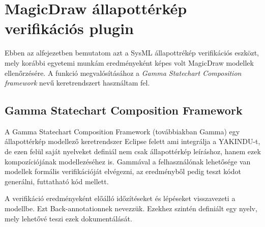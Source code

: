 \section{MagicDraw állapottérkép verifikációs plugin}

Ebben az alfejezetben bemutatom azt a SysML állapottrékép verifikációs eszközt, mely korábbi egyetemi munkám eredményeként képes volt MagicDraw modellek ellenőrzésére. A funkció megvalósításához a \emph{Gamma Statechart Composition framework} nevű keretrendszert használtam fel.

\subsection{Gamma Statechart Composition Framework}

A Gamma Statechart Composition Framework (továbbiakban Gamma) egy állapottérkép modellező keretrendszer Eclipse felett ami integrálja a YAKINDU-t, de ezen felül saját nyelveket definiál nem csak állapottérkép leíráshoz, hanem ezek kompozíciójának modellezéséhez is. Gammával a felhasználónak lehetősége van modellek formális verifikációját elvégezni, az eredményből pedig teszt kódot generálni, futtatható kód mellett.

A verifikáció eredményeként előálló időzítéseket és lépéseket visszavezeti a modellbe. Ezt Back-annotationnek nevezzük. Ezekhez szintén definiált egy nyelv, mely lehetővé teszi ezek dokumentálását.

